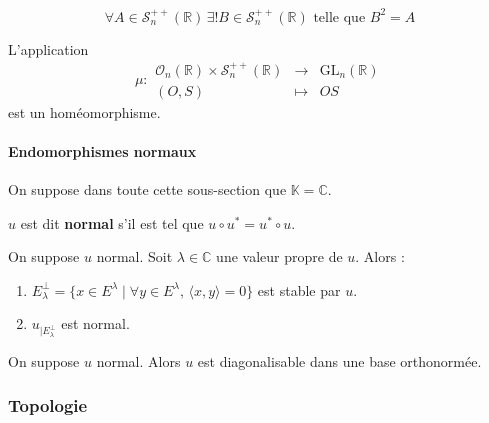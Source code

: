 
  \begin{lemma}
    \[ \forall A \in \mathcal{S}_n^{++}(\mathbb{R}) \, \exists! B \in \mathcal{S}_n^{++}(\mathbb{R}) \text{ telle que } B^2 = A \]
  \end{lemma}


  \begin{application}
    L'application
    \[ \mu :
    \begin{array}{ccc}
      \mathcal{O}_n(\mathbb{R}) \times \mathcal{S}_n^{++}(\mathbb{R}) &\rightarrow& \mathrm{GL}_n(\mathbb{R}) \\
      (O, S) &\mapsto& OS
    \end{array}
    \]
    est un homéomorphisme.
  \end{application}

  \paragraph{Endomorphismes normaux}

  On suppose dans toute cette sous-section que $\mathbb{K} = \mathbb{C}$.


  \begin{definition}
    $u$ est dit \textbf{normal} s'il est tel que $u \circ u^* = u^* \circ u$.
  \end{definition}

  \begin{proposition}
    On suppose $u$ normal. Soit $\lambda \in \mathbb{C}$ une valeur propre de $u$. Alors :
    \begin{enumerate}[label={\bfseries(\roman*)}]
      \item $E_\lambda^\perp = \{ x \in E^\lambda \mid \forall y \in E^\lambda, \, \langle x, y \rangle = 0 \}$ est stable par $u$.
      \item $u_{| E_\lambda^\perp}$ est normal.
    \end{enumerate}
  \end{proposition}

  \begin{corollary}
    On suppose $u$ normal. Alors $u$ est diagonalisable dans une base orthonormée.
  \end{corollary}

  \subsubsection{Topologie}

